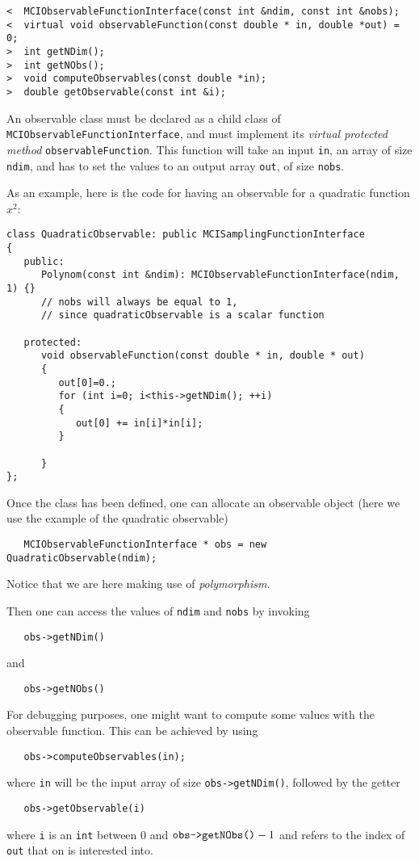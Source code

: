 \documentclass[11pt,a4paper,twoside]{article}
\begin{document}
\begin{verbatim}
<  MCIObservableFunctionInterface(const int &ndim, const int &nobs);
<  virtual void observableFunction(const double * in, double *out) = 0;
>  int getNDim();
>  int getNObs();
>  void computeObservables(const double *in);
>  double getObservable(const int &i);
\end{verbatim}

An observable class must be declared as a child class of \verb+MCIObservableFunctionInterface+, and must implement its \emph{virtual protected method} \verb+observableFunction+.
This function will take an input \verb+in+, an array of size \verb+ndim+, and has to set the values to an output array \verb+out+, of size \verb+nobs+.

As an example, here is the code for having an observable for a quadratic function $x^2$:
\begin{verbatim}
class QuadraticObservable: public MCISamplingFunctionInterface
{
   public:
      Polynom(const int &ndim): MCIObservableFunctionInterface(ndim, 1) {}
      // nobs will always be equal to 1, 
      // since quadraticObservable is a scalar function
      
   protected:
      void observableFunction(const double * in, double * out)
      {
         out[0]=0.;
         for (int i=0; i<this->getNDim(); ++i)
         {
            out[0] += in[i]*in[i];
         }
         
      }
};
\end{verbatim}

Once the class has been defined, one can allocate an observable object (here we use the example of the quadratic observable)
\begin{verbatim}
   MCIObservableFunctionInterface * obs = new QuadraticObservable(ndim);
\end{verbatim}
Notice that we are here making use of \emph{polymorphism}.

Then one can access the values of \verb+ndim+ and \verb+nobs+ by invoking
\begin{verbatim}
   obs->getNDim()
\end{verbatim}
and
\begin{verbatim}
   obs->getNObs()
\end{verbatim}

For debugging purposes, one might want to compute some values with the observable function.
This can be achieved by using
\begin{verbatim}
   obs->computeObservables(in);
\end{verbatim}
where \verb+in+ will be the input array of size \verb+obs->getNDim()+, followed by the getter
\begin{verbatim}
   obs->getObservable(i)
\end{verbatim}
where \verb+i+ is an \verb+int+ between $0$ and $\verb+obs->getNObs()+ - 1$ and refers to the index of \verb+out+ that on is interested into.
\end{document}
